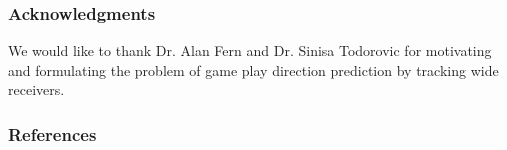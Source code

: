 \documentclass{article} %
\begin{document}
%
%
% 
% 


\subsubsection*{Acknowledgments}

We would like to thank Dr. Alan Fern and  Dr. Sinisa Todorovic for motivating and formulating the problem of game play direction prediction by tracking wide receivers.


\subsubsection*{References}
\end{document}
